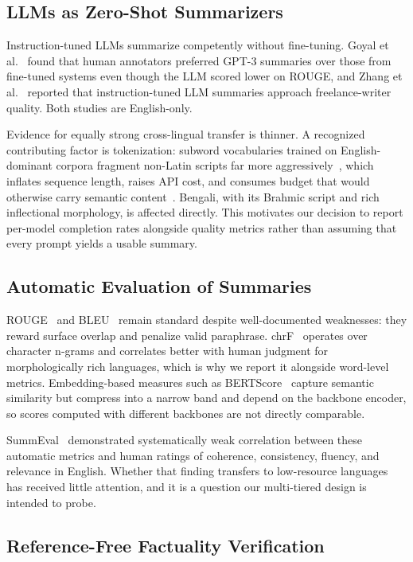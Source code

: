 \documentclass[runningheads]{llncs}
\begin{document}
\subsection{LLMs as Zero-Shot Summarizers}

Instruction-tuned LLMs summarize competently without fine-tuning. Goyal et
al.~\cite{goyal2022} found that human annotators preferred GPT-3 summaries over
those from fine-tuned systems even though the LLM scored lower on ROUGE, and
Zhang et al.~\cite{zhang2024news} reported that instruction-tuned LLM summaries
approach freelance-writer quality. Both studies are English-only.

Evidence for equally strong cross-lingual transfer is thinner. A recognized
contributing factor is tokenization: subword vocabularies trained on
English-dominant corpora fragment non-Latin scripts far more
aggressively~\cite{rust2021}, which inflates sequence length, raises API cost,
and consumes budget that would otherwise carry semantic
content~\cite{ahia2023,petrov2023}. Bengali, with its Brahmic script and rich
inflectional morphology, is affected directly. This motivates our decision to
report per-model completion rates alongside quality metrics rather than
assuming that every prompt yields a usable summary.

\subsection{Automatic Evaluation of Summaries}

ROUGE~\cite{lin2004} and BLEU~\cite{papineni2002} remain standard despite
well-documented weaknesses: they reward surface overlap and penalize valid
paraphrase. chrF~\cite{popovic2015} operates over character n-grams and
correlates better with human judgment for morphologically rich languages, which
is why we report it alongside word-level metrics. Embedding-based measures such
as BERTScore~\cite{zhang2019} capture semantic similarity but compress into a
narrow band and depend on the backbone encoder, so scores computed with
different backbones are not directly comparable.

SummEval~\cite{fabbri2021} demonstrated systematically weak correlation between
these automatic metrics and human ratings of coherence, consistency, fluency,
and relevance in English. Whether that finding transfers to low-resource
languages has received little attention, and it is a question our multi-tiered
design is intended to probe.

\subsection{Reference-Free Factuality Verification}
\end{document}
